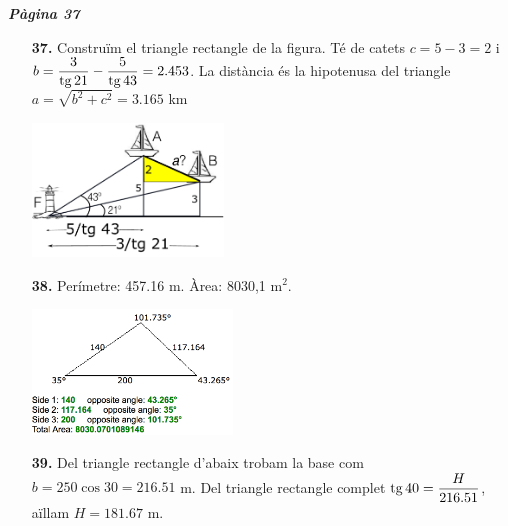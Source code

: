\documentclass[a4paper, pdf, twoside]{book}
\begin{document}
\begin{multicols}{2}
{\textbf{\em Pàgina 37}} \hrulefill
\begin{enumerate}
\vspace{0.25cm}
\item[\fontfamily{phv}\selectfont\color{blue}\textbf{37. }] 
Construïm el triangle rectangle de la figura. Té de catets $c=5-3=2$ i $b=\dfrac {3}{\mathrm{tg}\, 21} - \dfrac {5}{\mathrm{tg}\, 43}=2.453$. La distància és la hipotenusa del triangle $a=\sqrt {b^2+c^2}=3.165$ km  \par \includegraphics [width=0.4\textwidth ]{img-sol/t3-37} 
 \end{enumerate}
\begin{enumerate}
\vspace{0.25cm}
\item[\fontfamily{phv}\selectfont\color{blue}\textbf{38. }] 
Perímetre: 457.16 m. Àrea: 8030,1 m$^2$.  \par \includegraphics [width=0.42\textwidth ]{img-sol/t3-38} 
\vspace{0.25cm}
\item[\fontfamily{phv}\selectfont\color{blue}\textbf{39. }] 
Del triangle rectangle d'abaix trobam la base com $b=250\cos 30=216.51$ m. Del triangle rectangle complet $\mathrm{tg}\, 40 = \dfrac {H}{216.51}$, aïllam $H=181.67$ m.
\vspace{0.25cm}




\end{enumerate}
\end{multicols}
\end{document}
